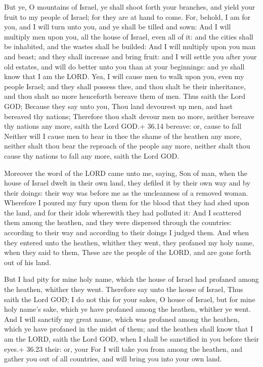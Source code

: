  But ye, O mountains of Israel, ye shall shoot forth your
branches, and yield your fruit to my people of Israel; for they are at
hand to come.  For, behold, I am for you, and I will turn
unto you, and ye shall be tilled and sown:  And I will
multiply men upon you, all the house of Israel, even all of it: and the
cities shall be inhabited, and the wastes shall be builded:
 And I will multiply upon you man and beast; and they shall
increase and bring fruit: and I will settle you after your old estates,
and will do better unto you than at your beginnings: and ye shall know
that I am the LORD.  Yea, I will cause men to walk upon
you, even my people Israel; and they shall possess thee, and thou shalt
be their inheritance, and thou shalt no more henceforth bereave them of
men.  Thus saith the Lord GOD; Because they say unto you,
Thou land devourest up men, and hast bereaved thy nations; 
Therefore thou shalt devour men no more, neither bereave thy nations any
more, saith the Lord GOD.+ 36.14 bereave: or, cause to fall
 Neither will I cause men to hear in thee the shame of the
heathen any more, neither shalt thou bear the reproach of the people any
more, neither shalt thou cause thy nations to fall any more, saith the
Lord GOD.

 Moreover the word of the LORD came unto me, saying,
 Son of man, when the house of Israel dwelt in their own
land, they defiled it by their own way and by their doings: their way
was before me as the uncleanness of a removed woman. 
Wherefore I poured my fury upon them for the blood that they had shed
upon the land, and for their idols wherewith they had polluted it:
 And I scattered them among the heathen, and they were
dispersed through the countries: according to their way and according to
their doings I judged them.  And when they entered unto the
heathen, whither they went, they profaned my holy name, when they said
to them, These are the people of the LORD, and are gone forth out of his
land.

 But I had pity for mine holy name, which the house of
Israel had profaned among the heathen, whither they went. 
Therefore say unto the house of Israel, Thus saith the Lord GOD; I do
not this for your sakes, O house of Israel, but for mine holy name's
sake, which ye have profaned among the heathen, whither ye went.
 And I will sanctify my great name, which was profaned
among the heathen, which ye have profaned in the midst of them; and the
heathen shall know that I am the LORD, saith the Lord GOD, when I shall
be sanctified in you before their eyes.+ 36.23 their: or, your
 For I will take you from among the heathen, and gather you
out of all countries, and will bring you into your own land.

